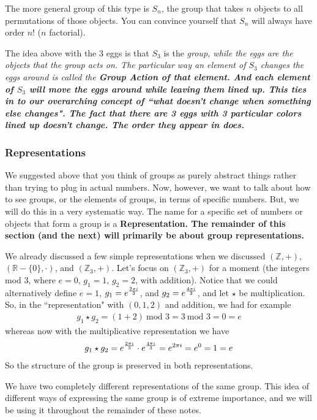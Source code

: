 \documentclass[12pt,epsf]{article}
\def\nolabel{\nonumber }
\newcommand{\mmod}{\mbox{mod }}
\def\nolabel{\nonumber }
\begin{document}
The more general group of this type is $S_n$, the group that takes $n$ objects
to all permutations of those objects.  You can convince yourself that $S_n$ 
will always have order $n!$ ($n$ factorial).  

The idea above with the 3 eggs is that $S_3$ is the \it group\rm, while
the eggs are the objects that the group \it acts on\rm.  The particular
way an element of $S_3$ changes the eggs around is called the \bf Group
Action \rm of that element.  And each element of $S_3$ will move the
eggs around while leaving them lined up.  This ties in to our
overarching concept of ``what doesn't change when something else
changes".  The fact that there are 3 eggs with 3 particular colors
lined up doesn't change.  The order they appear in does.  

\subsubsection{Representations}

We suggested above that you think of groups as purely abstract things
rather than trying to plug in actual numbers.  Now, however, we want to
talk about how to see groups, or the elements of groups, in terms of
specific numbers.  But, we will do this in a very systematic way.  The
name for a specific set of numbers or objects that form a group is a
\bf Representation\rm.	The remainder of this section (and the next)
will primarily be about group representations.	

We already discussed a few simple representations when we discussed
$(\mathbb{Z},+)$, $(\mathbb{R}-\{0\},\cdot)$, and $(\mathbb{Z}_3,+)$. 
Let's focus on $(\mathbb{Z}_3,+)$ for a moment (the integers mod 3,
where $e=0$, $g_1=1$, $g_2=2$, with addition).	Notice that we could
alternatively define $e=1$, $g_1 = e^{{2\pi i \over 3}}$, and
$g_2=e^{{4\pi i \over 3}}$, and let $\star$ be multiplication.	So, in
the ``representation" with $(0,1,2)$ and addition, we had for example
\begin{eqnarray}
g_1\star g_2 = (1+2)~\mmod 3 = 3~\mmod 3 = 0 = e \nolabel 
\end{eqnarray}
whereas now with the multiplicative representation we have
\begin{eqnarray}
g_1 \star g_2 = e^{{2\pi i \over 3}} \cdot e^{{4 \pi i \over 3}} =
e^{2\pi i} = e^0 = 1 = e \nolabel
\end{eqnarray}
So the structure of the group is preserved in both representations.  

We have two completely different representations of the same group. 
This idea of different ways of expressing the same group is of extreme
importance, and we will be using it throughout the remainder of these
notes.	
\end{document}
